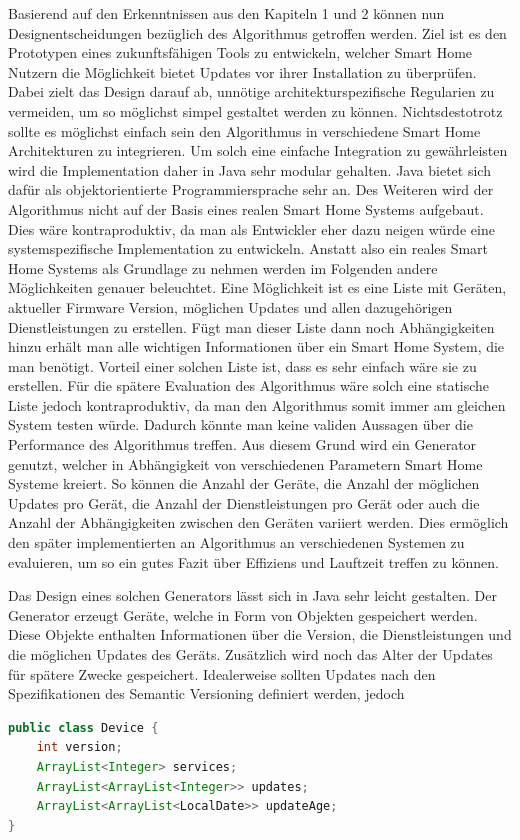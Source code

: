 Basierend auf den Erkenntnissen aus den Kapiteln 1 und 2 können nun Designentscheidungen bezüglich des Algorithmus getroffen
werden. Ziel ist es den Prototypen eines zukunftsfähigen Tools zu entwickeln, welcher Smart Home Nutzern die Möglichkeit bietet
Updates vor ihrer Installation zu überprüfen.
Dabei zielt das Design darauf ab, unnötige architekturspezifische Regularien zu vermeiden, um so möglichst simpel
gestaltet werden zu können. Nichtsdestotrotz sollte es möglichst einfach sein den Algorithmus in verschiedene Smart Home 
Architekturen zu integrieren. Um solch eine einfache Integration zu gewährleisten wird die Implementation daher
in Java sehr modular gehalten. Java bietet sich dafür als objektorientierte Programmiersprache sehr an.
Des Weiteren wird der Algorithmus nicht auf der Basis eines realen Smart Home Systems aufgebaut. Dies wäre kontraproduktiv,
da man als Entwickler eher dazu neigen würde eine systemspezifische Implementation zu entwickeln. Anstatt also ein reales
Smart Home Systems als Grundlage zu nehmen werden im Folgenden andere Möglichkeiten genauer beleuchtet. 
Eine Möglichkeit ist es eine Liste mit 
Geräten, aktueller Firmware Version, möglichen Updates und allen dazugehörigen Dienstleistungen zu erstellen. Fügt
man dieser Liste dann noch Abhängigkeiten hinzu erhält man alle wichtigen Informationen über ein Smart Home System,
die man benötigt. Vorteil einer solchen Liste ist, dass es sehr einfach wäre sie zu erstellen. Für die spätere Evaluation des 
Algorithmus wäre solch eine statische Liste jedoch kontraproduktiv, da man den Algorithmus somit immer am gleichen 
System testen würde. Dadurch könnte man keine validen Aussagen über die Performance des Algorithmus treffen. Aus 
diesem Grund wird ein Generator genutzt, welcher in Abhängigkeit von verschiedenen Parametern Smart Home Systeme kreiert.
So können die Anzahl der Geräte, die Anzahl der möglichen 
Updates pro Gerät, die Anzahl der Dienstleistungen pro Gerät oder auch die Anzahl der Abhängigkeiten zwischen den
Geräten variiert werden. Dies ermöglich den später implementierten an Algorithmus an verschiedenen Systemen zu 
evaluieren, um so ein gutes Fazit über Effiziens und Lauftzeit treffen zu können. 

Das Design eines solchen Generators lässt sich in Java  sehr leicht gestalten.
Der Generator erzeugt Geräte, welche in Form von Objekten gespeichert werden. Diese Objekte enthalten Informationen über
die Version, die Dienstleistungen und die möglichen Updates des Geräts. Zusätzlich wird noch das Alter der Updates für spätere
Zwecke gespeichert. Idealerweise sollten Updates nach den Spezifikationen des Semantic Versioning definiert werden, jedoch 
\begin{lstlisting}[language=Java]
public class Device {
    int version;
    ArrayList<Integer> services;
    ArrayList<ArrayList<Integer>> updates;
    ArrayList<ArrayList<LocalDate>> updateAge;
}
\end{lstlisting}

